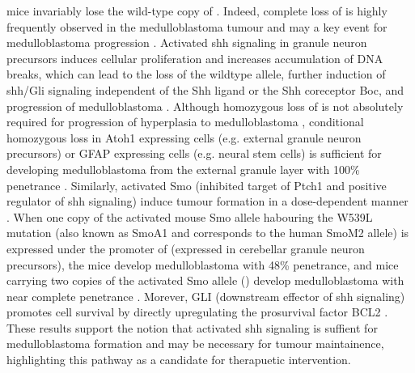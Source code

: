 mice invariably lose the wild-type copy of  . Indeed, complete loss of  is highly frequently observed in the medulloblastoma tumour and may a key event for medulloblastoma progression . Activated \gls{shh} signaling in \high{-/+} granule neuron precursors induces cellular proliferation and increases accumulation of DNA breaks, which can lead to the loss of the wildtype  allele, further induction of \gls{shh}/Gli signaling independent of the Shh ligand or the Shh coreceptor Boc, and progression of medulloblastoma . Although homozygous loss of  is not absolutely required for progression of hyperplasia to medulloblastoma , conditional homozygous loss in Atoh1 expressing cells (e.g. external granule neuron precursors) or GFAP expressing cells (e.g. neural stem cells) is sufficient for developing medulloblastoma from the external granule layer with 100\% penetrance . Similarly, activated Smo (inhibited target of Ptch1 and positive regulator of \gls{shh} signaling) induce tumour formation in a dose-dependent manner . When one copy of the activated mouse Smo allele habouring the W539L mutation (also known as SmoA1 and corresponds to the human SmoM2 allele) is expressed under the promoter of  (expressed in cerebellar granule neuron precursors), the mice develop medulloblastoma with 48\% penetrance, and mice carrying two copies of the activated Smo allele () develop medulloblastoma with near complete penetrance . Morever, GLI (downstream effector of \gls{shh} signaling) promotes cell survival by directly upregulating the prosurvival factor BCL2 . These results support the notion that activated \gls{shh} signaling is suffient for medulloblastoma formation and may be necessary for tumour maintainence, highlighting this pathway as a candidate for therapuetic intervention.

